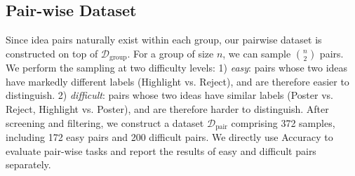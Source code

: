 \subsection{Pair-wise Dataset}
Since idea pairs naturally exist within each group, our pairwise dataset is constructed on top of $\boldsymbol{\mathcal{D}}_{\textrm{group}}$.  
For a group of size $n$, we can sample $\binom{n}{2}$ pairs. We perform the sampling at two difficulty levels:
1) \textit{easy}: pairs whose two ideas have markedly different labels (Highlight vs. Reject), and are therefore easier to distinguish.  
2) \textit{difficult}: pairs whose two ideas have similar labels (Poster vs. Reject, Highlight vs. Poster), and are therefore harder to distinguish.
After screening and filtering, we construct a dataset $\boldsymbol{\mathcal{D}}_{\textrm{pair}}$ comprising 372 samples, including 172 easy pairs and 200 difficult pairs.
We directly use Accuracy to evaluate pair-wise tasks and report the results of easy and difficult pairs separately.